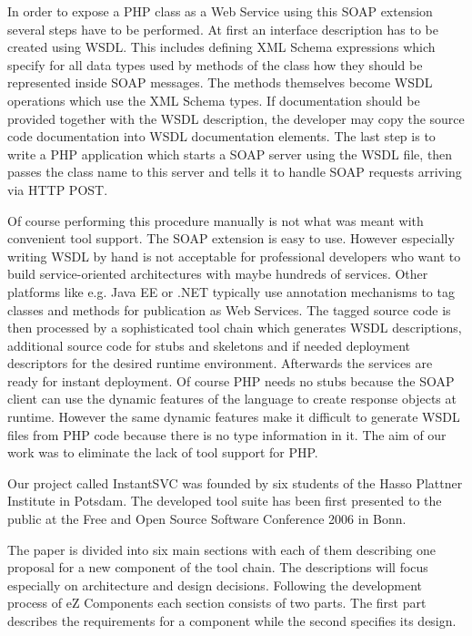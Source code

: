 \documentclass[10pt,final,a4paper,oneside]{article}
\begin{document}
In order to expose a PHP class as a Web Service using this SOAP extension
several steps have to be performed.
At first an interface description has to be created using WSDL. This includes
defining XML Schema expressions \cite{XMLSchema} which specify for all data types
used by methods of the class how they should be represented inside SOAP messages.
The methods themselves become WSDL operations which use the XML Schema types.
If documentation should be provided together with the WSDL description,
the developer may copy the source code documentation into
WSDL documentation elements.
The last step is to write a PHP application which starts a SOAP server
using the WSDL file, then passes the class name to this server and tells it to
handle SOAP requests arriving via HTTP POST.

Of course performing this procedure manually is not what was meant with
convenient tool support.
The SOAP extension is easy to use. However especially writing WSDL by hand is not
acceptable for professional developers who want to build service-oriented
architectures \cite{SOA} with maybe hundreds of services. Other platforms like e.g.
Java EE or .NET typically use annotation mechanisms to tag classes and methods
for publication as Web Services. The tagged source code is then processed by a
sophisticated tool chain which generates WSDL descriptions, additional source code
for stubs and skeletons and if needed deployment descriptors for the desired
runtime environment.
Afterwards the services are ready for instant deployment.
Of course PHP needs no stubs because the SOAP client can use the dynamic
features of the language to create response objects at runtime.
However the same dynamic features make it difficult to generate WSDL files from PHP
code because there is no type information in it.
The aim of our work was to eliminate the lack of tool support for PHP.

Our project called InstantSVC \cite{InstantSVC}
was founded by six students of the Hasso Plattner Institute in Potsdam.
The developed tool suite has been first presented to the public
at the Free and Open Source Software Conference 2006 in Bonn.

The paper is divided into six main sections
with each of them describing one proposal
for a new component of the tool chain.
The descriptions will focus especially on architecture and design decisions.
Following the development process of eZ Components each section consists of two parts.
The first part describes the requirements for a component while the second
specifies its design.
\end{document}
